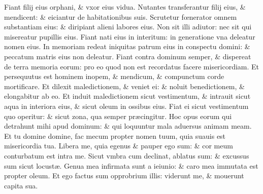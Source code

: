 \documentclass[a5paper,10pt]{book}
\def\ae{æ}
\def\oe{œ}
\begin{document}
\begin{multicols*}{2}
\newline \color{red} F\color{black}iant filij eius orphani, \& vxor eius vidua.
\newline \color{red} N\color{black}utantes transferantur filij eius, \& mendicent: \& eiciantur de habitationibus suis.
\newline \color{red} S\color{black}crutetur f\oe nerator omnem substantiam eius: \& diripiant alieni labores eius.
\newline \color{red} N\color{black}on sit illi adiutor: nec sit qui misereatur pupillis eius.
\newline \color{red} F\color{black}iant nati eius in interitum: in generatione vna deleatur nomen eius.
\newline \color{red} I\color{black}n memoriam redeat iniquitas patrum eius in conspectu domini: \& peccatum matris eius non deleatur.
\newline \color{red} F\color{black}iant contra dominum semper, \& dispereat de terra memoria eorum: pro eo quod non est recordatus facere misericordiam.
\newline \color{red} E\color{black}t persequutus est hominem inopem, \& mendicum, \& compunctum corde mortificare.
\newline \color{red} E\color{black}t dilexit maledictionem, \& veniet ei: \& noluit benedictionem, \& elongabitur ab eo.
\newline \color{red} E\color{black}t induit maledictionem sicut vestimentum, \& intrauit sicut aqua in interiora eius, \& sicut oleum in ossibus eius.
\newline \color{red} F\color{black}iat ei sicut vestimentum quo operitur: \& sicut zona, qua semper pr\ae cingitur.
\newline \color{red} H\color{black}oc opus eorum qui detrahunt mihi apud dominum: \& qui loquuntur mala aduersus animam meam.
\newline \color{red} E\color{black}t tu domine domine, fac mecum propter nomen tuum, quia suauis est misericordia tua.
\newline \color{red} L\color{black}ibera me, quia egenus \& pauper ego sum: \& cor meum conturbatum est intra me.
\newline \color{red} S\color{black}icut vmbra cum declinat, ablatus sum: \& excussus sum sicut locust\ae .
\newline \color{red} G\color{black}enua mea infirmata sunt a ieiunio: \& caro mea immutata est propter oleum.
\newline \color{red} E\color{black}t ego factus sum opprobrium illis: viderunt me, \& mouerunt capita sua.

\end{multicols*}
\end{document}
